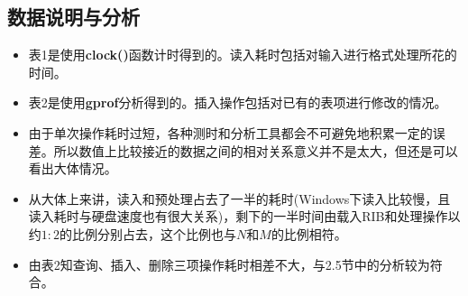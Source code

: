 \subsection{数据说明与分析}

\begin{itemize}
\item 表1是使用\textbf{clock()}函数计时得到的。读入耗时包括对输入进行格式处理所花的时间。
\item 表2是使用\textbf{gprof}分析得到的。插入操作包括对已有的表项进行修改的情况。
\item 由于单次操作耗时过短，各种测时和分析工具都会不可避免地积累一定的误差。所以数值上比较接近的数据之间的相对关系意义并不是太大，但还是可以看出大体情况。
\item 从大体上来讲，读入和预处理占去了一半的耗时(Windows下读入比较慢，且读入耗时与硬盘速度也有很大关系)，剩下的一半时间由载入RIB和处理操作以约$1:2$的比例分别占去，这个比例也与$N$和$M$的比例相符。
\item 由表2知查询、插入、删除三项操作耗时相差不大，与2.5节中的分析较为符合。
\end{itemize}

\clearpage